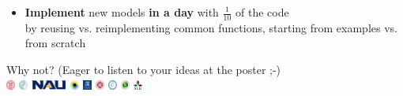 \documentclass[]{beamer}
\begin{document}
\begin{frame}
\begin{itemize}
	  \item
		  {\bf Implement} new models {\bf in a day} with $\frac{1}{10}$ of the code
		  \\
		  {\tiny by reusing vs. reimplementing common functions, starting from examples vs. from scratch} 
	  \end{itemize}
	
	  \alert{Why not?} (Eager to listen to your ideas at the \alert{poster} ;-)
	  \\
	  \vspace{.5cm}
	  \includegraphics[height=0.3cm, keepaspectratio]{Figures/bold_cornell_seal_cmyk_red}
	  \includegraphics[height=0.3cm, keepaspectratio]{Figures/minerva}
	  \includegraphics[height=0.3cm, keepaspectratio]{Figures/NAU}
	  \includegraphics[height=0.3cm, keepaspectratio]{Figures/idiv}
	  \includegraphics[height=0.3cm, keepaspectratio]{Figures/Logo_of_the_University_of_Melbourne}
	  \includegraphics[height=0.3cm, keepaspectratio]{Figures/EastChinaUni.png}
	  \includegraphics[height=0.3cm, keepaspectratio]{Figures/IGSNRR}
	  \includegraphics[height=0.3cm, keepaspectratio]{Figures/Northwest_A&F_University}
	  \includegraphics[height=0.3cm, keepaspectratio]{Figures/SLU}
	\end{frame}
\end{document}
